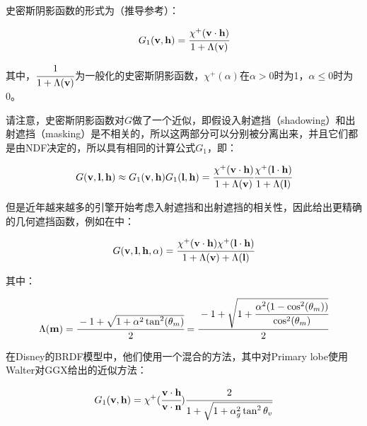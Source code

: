\begin{shaded}
	史密斯阴影函数的形式为（推导参考\cite{a:UnderstandingtheMaskingShadowingFunctioninMicrofacetBasedBRDFs}）：
	
	\begin{equation}
		G_1(\mathbf{v},\mathbf{h})= \cfrac{\chi^{+}(\mathbf{v}\cdot\mathbf{h})}{1+\Lambda (\mathbf{v})}
	\end{equation}
	
	\noindent 其中，$\cfrac{1}{1+\Lambda (\mathbf{v})}$为一般化的史密斯阴影函数，$\chi^{+}(\alpha)$在$\alpha>0$时为1，$\alpha\leq 0$时为0。
	
	请注意，史密斯阴影函数对$G$做了一个近似，即假设入射遮挡（shadowing）和出射遮挡（masking）是不相关的，所以这两部分可以分别被分离出来，并且它们都是由NDF决定的，所以具有相同的计算公式$G_1$，即：

\begin{equation}\label{eq:intro-smith-shadow-masking}
	G(\mathbf{v,\mathbf{l},\mathbf{h}})\approx G_1(\mathbf{v},\mathbf{h})G_1(\mathbf{l},\mathbf{h})= \cfrac{\chi^{+}(\mathbf{v}\cdot\mathbf{h})}{1+\Lambda (\mathbf{v})} \cfrac{\chi^{+}(\mathbf{l}\cdot\mathbf{h})}{1+\Lambda (\mathbf{l})}
\end{equation}

但是近年越来越多的引擎开始考虑入射遮挡和出射遮挡的相关性，因此给出更精确的几何遮挡函数，例如在\cite{a:MovingFrostbitetoPBR}中：

	\begin{equation}\label{eq:intro-correct-shadow-masking}
		G(\mathbf{v},\mathbf{l},\mathbf{h},\alpha)= \cfrac{\chi^{+}(\mathbf{v}\cdot\mathbf{h})\chi^{+}(\mathbf{l}\cdot\mathbf{h})}{1+\Lambda (\mathbf{v})+\Lambda (\mathbf{l})}
	\end{equation}

\noindent 其中：

\begin{equation}
	\Lambda (\mathbf{m})= \cfrac{-1+\sqrt{1+\alpha^2 \tan^2 (\theta_m)}}{2}= \cfrac{-1+\sqrt{1+ \cfrac{\alpha^2 (1-\cos^2 (\theta_m))}{\cos^2 (\theta_m)}}}{2}
\end{equation}


\end{shaded}

在Disney的BRDF模型中，他们使用一个混合的方法，其中对Primary lobe使用Walter\cite{a:Microfacetmodelsforrefractionthroughroughsurfaces}对GGX给出的近似方法：

\begin{equation}
	G_1(\mathbf{v},\mathbf{h})=\chi^{+}( \cfrac{\mathbf{v}\cdot\mathbf{h}}{\mathbf{v}\cdot\mathbf{n}})   \cfrac{2}{1+\sqrt{1+\alpha^2_g \tan^2 \theta_v}}
\end{equation}

